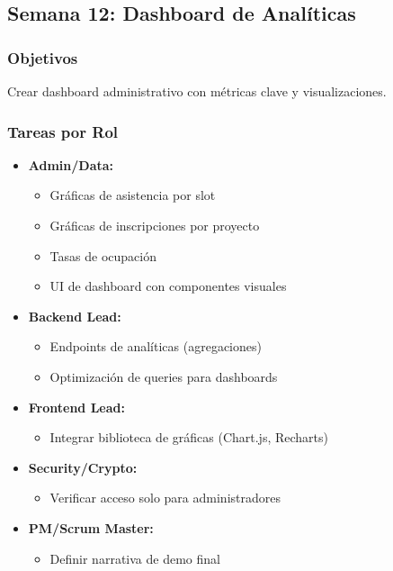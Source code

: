 \documentclass[12pt,a4paper]{article}
\begin{document}
\subsection{Semana 12: Dashboard de Analíticas}

\subsubsection{Objetivos}
Crear dashboard administrativo con métricas clave y visualizaciones.

\subsubsection{Tareas por Rol}

\begin{itemize}[leftmargin=*]
    \item \textbf{Admin/Data:}
    \begin{itemize}
        \item Gráficas de asistencia por slot
        \item Gráficas de inscripciones por proyecto
        \item Tasas de ocupación
        \item UI de dashboard con componentes visuales
    \end{itemize}
    
    \item \textbf{Backend Lead:}
    \begin{itemize}
        \item Endpoints de analíticas (agregaciones)
        \item Optimización de queries para dashboards
    \end{itemize}
    
    \item \textbf{Frontend Lead:}
    \begin{itemize}
        \item Integrar biblioteca de gráficas (Chart.js, Recharts)
    \end{itemize}
    
    \item \textbf{Security/Crypto:}
    \begin{itemize}
        \item Verificar acceso solo para administradores
    \end{itemize}
    
    \item \textbf{PM/Scrum Master:}
    \begin{itemize}
        \item Definir narrativa de demo final
    \end{itemize}
\end{itemize}
\end{document}
